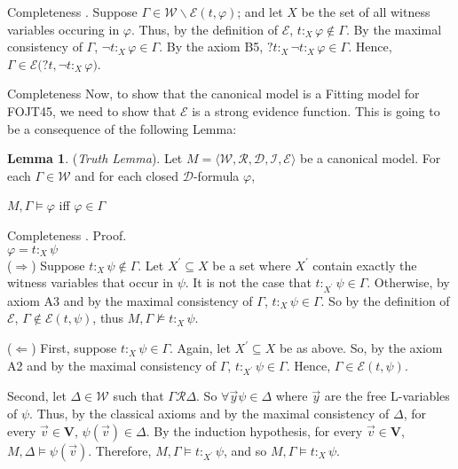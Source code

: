 \documentclass{beamer}
\theoremstyle{definition}
\newtheorem{lema}{Lemma}
\newcommand{\D}{\mathcal{D}}
\newcommand{\W}{\mathcal{W}}
\newcommand{\R}{\mathcal{R}}
\newcommand{\E}{\mathcal{E}}
\newcommand{\I}{\mathcal{I}}
\newcommand{\Fmodel}{\bl\W,\R,\D,\I,\E \br}
\newcommand{\p}{^{\prime}}
\newcommand{\nmodels}{\not\models}
\newcommand{\nao}{\neg}
\newcommand{\todo}{\forall}
\newcommand{\bl}{\langle}
\newcommand{\br}{\rangle}
\begin{document}
\begin{frame}{Completeness}
. Suppose $\Gamma \in \W \backslash \E(t,\varphi)$; and let $X$ be the set of all witness variables occuring in $\varphi$. Thus, by the definition of $\E$, $t$$:_{X}$$\varphi \notin \Gamma$. By the maximal consistency of $\Gamma$,  $\nao t$$:_{X}$$\varphi \in \Gamma$. By the axiom B5, $?t$$:_{X}$$\nao t$$:_{X}$$\varphi \in \Gamma$. Hence, $\Gamma \in \E(?t,\nao t$$:_{X}$$\varphi)$.
\end{frame}


\begin{frame}{Completeness}
\qquad Now, to show that the canonical model is a Fitting model for FOJT45, we need to show that $\E$ is a strong evidence function. This is going to be a consequence of the following Lemma:
\vspace{5mm}	
	
	
\begin{lema}
	(\textit{Truth Lemma}). Let $M=\Fmodel$ be a canonical model. For each $\Gamma \in \W$ and for each closed $\D$-formula $\varphi$,
	\begin{center}
		$M,\Gamma \models \varphi$ iff $\varphi \in \Gamma$
	\end{center}
\end{lema}
\end{frame}

\begin{frame}{Completeness}
\hphantom .{\color{blue} Proof.}\\
$\varphi = t$$:_{X}$$\psi$\\

\qquad ($\Rightarrow$) Suppose $t$$:_{X}$$\psi \notin \Gamma$. Let $X\p \subseteq X$ be a set where $X\p$ contain exactly the witness variables that occur in $\psi$. It is not the case that $t$$:_{X\p}$$\psi \in \Gamma$. Otherwise, by axiom A3 and by the maximal consistency of $\Gamma$,  $t$$:_{X}$$\psi \in \Gamma$. So by the definition of $\E$, $\Gamma \notin \E(t,\psi)$, thus $M,\Gamma \nmodels t$$:_{X}$$\psi$.

\vspace{2mm}

\qquad ($\Leftarrow$) First, suppose $t$$:_{X}$$\psi \in \Gamma$. Again, let $X\p \subseteq X$ be as above. So, by the axiom A2 and by the maximal consistency of $\Gamma$, $t$$:_{X\p}$$\psi \in \Gamma$. Hence, $\Gamma \in \E(t,\psi)$. 

\qquad Second, let $\Delta \in \W$ such that $\Gamma \R \Delta$. So $\todo \vec{y}\psi \in \Delta$ where $\vec{y}$ are the free L-variables of $\psi$. Thus, by the classical axioms and by the maximal consistency of $\Delta$, for every $\vec{v} \in \textbf{V}$,  $\psi(\vec{v}) \in \Delta$. By the induction hypothesis, for every $\vec{v} \in \textbf{V}$, $M, \Delta \models \psi(\vec{v})$. Therefore, $M,\Gamma \models t$$:_{X\p}$$\psi$, and so $M,\Gamma \models t$$:_{X}$$\psi$.\\
\end{frame}
\end{document}
